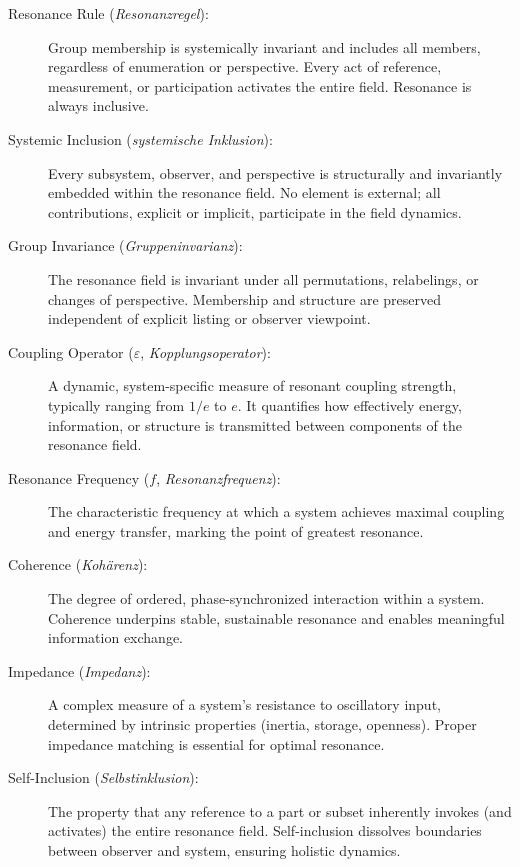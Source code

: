 \documentclass[12pt]{article}
\begin{document}
\begin{description}
	\item[Resonance Rule (\textit{Resonanzregel}):]  
	Group membership is systemically invariant and includes all members, regardless of enumeration or perspective. Every act of reference, measurement, or participation activates the entire field. Resonance is always inclusive.
	
	\item[Systemic Inclusion (\textit{systemische Inklusion}):]  
	Every subsystem, observer, and perspective is structurally and invariantly embedded within the resonance field. No element is external; all contributions, explicit or implicit, participate in the field dynamics.
	
	\item[Group Invariance (\textit{Gruppeninvarianz}):]  
	The resonance field is invariant under all permutations, relabelings, or changes of perspective. Membership and structure are preserved independent of explicit listing or observer viewpoint.
	
	\item[Coupling Operator ($\varepsilon$, \textit{Kopplungsoperator}):]  
	A dynamic, system-specific measure of resonant coupling strength, typically ranging from $1/e$ to $e$. It quantifies how effectively energy, information, or structure is transmitted between components of the resonance field.
	
	\item[Resonance Frequency ($f$, \textit{Resonanzfrequenz}):]  
	The characteristic frequency at which a system achieves maximal coupling and energy transfer, marking the point of greatest resonance.
	
	\item[Coherence (\textit{Kohärenz}):]  
	The degree of ordered, phase-synchronized interaction within a system. Coherence underpins stable, sustainable resonance and enables meaningful information exchange.
	
	\item[Impedance (\textit{Impedanz}):]  
	A complex measure of a system’s resistance to oscillatory input, determined by intrinsic properties (inertia, storage, openness). Proper impedance matching is essential for optimal resonance.
	
	\item[Self-Inclusion (\textit{Selbstinklusion}):]  
	The property that any reference to a part or subset inherently invokes (and activates) the entire resonance field. Self-inclusion dissolves boundaries between observer and system, ensuring holistic dynamics.
	

\end{description}
\end{document}
